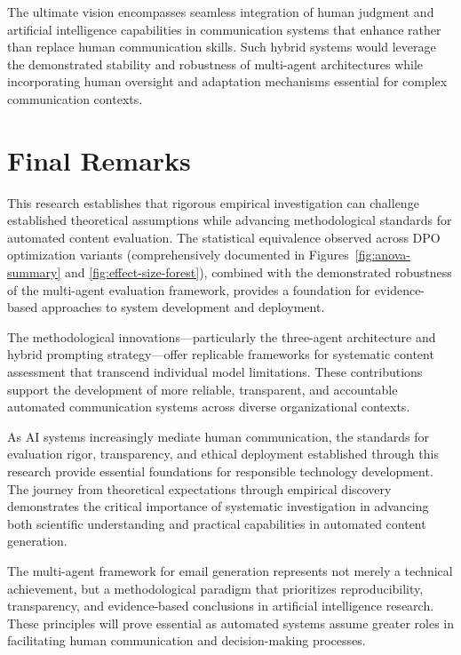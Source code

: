 The ultimate vision encompasses seamless integration of human judgment and artificial intelligence capabilities in communication systems that enhance rather than replace human communication skills. Such hybrid systems would leverage the demonstrated stability and robustness of multi-agent architectures while incorporating human oversight and adaptation mechanisms essential for complex communication contexts.

\section{Final Remarks}
\label{sec:final-remarks}

This research establishes that rigorous empirical investigation can challenge established theoretical assumptions while advancing methodological standards for automated content evaluation. The statistical equivalence observed across DPO optimization variants (comprehensively documented in Figures~\ref{fig:anova-summary} and \ref{fig:effect-size-forest}), combined with the demonstrated robustness of the multi-agent evaluation framework, provides a foundation for evidence-based approaches to system development and deployment.

The methodological innovations—particularly the three-agent architecture and hybrid prompting strategy—offer replicable frameworks for systematic content assessment that transcend individual model limitations. These contributions support the development of more reliable, transparent, and accountable automated communication systems across diverse organizational contexts.

As AI systems increasingly mediate human communication, the standards for evaluation rigor, transparency, and ethical deployment established through this research provide essential foundations for responsible technology development. The journey from theoretical expectations through empirical discovery demonstrates the critical importance of systematic investigation in advancing both scientific understanding and practical capabilities in automated content generation.

The multi-agent framework for email generation represents not merely a technical achievement, but a methodological paradigm that prioritizes reproducibility, transparency, and evidence-based conclusions in artificial intelligence research. These principles will prove essential as automated systems assume greater roles in facilitating human communication and decision-making processes.

